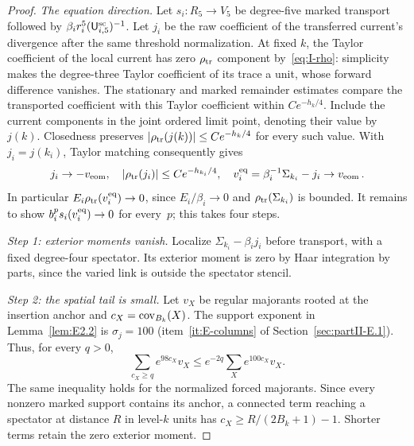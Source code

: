 \begin{proof}
\emph{The equation direction.} Let $s_i:R_5\to V_5$ be degree-five marked transport followed by $\beta_ir_i^5(\mathsf{U}_{i,5}^{\mathrm{sc}})^{-1}$. Let $j_i$ be the raw coefficient of the transferred current's divergence after the same threshold normalization. At fixed $k$, the Taylor coefficient of the local current has zero $\rho_{\rm tr}$ component by~\eqref{eq:I-rho}: simplicity makes the degree-three Taylor coefficient of its trace a unit, whose forward difference vanishes. The stationary and marked remainder estimates compare the transported coefficient with this Taylor coefficient within $Ce^{-h_k/4}$. Include the current components in the joint ordered limit point, denoting their value by $j(k)$. Closedness preserves $|\rho_{\rm tr}(j(k))|\le Ce^{-h_k/4}$ for every such value. With $j_i=j(k_i)$, Taylor matching consequently gives
\begin{equation*}
j_i\to-v_{\rm eom},\quad |\rho_{\rm tr}(j_i)|\le C e^{-h_{k_i}/4},\quad
v_i^{\rm eq}=\beta_i^{-1}\Sigma_{k_i}-j_i\to v_{\rm eom}\,.
\end{equation*}
In particular $E_i\rho_{\rm tr}(v_i^{\rm eq})\to0$, since $E_i/\beta_i\to0$ and $\rho_{\rm tr}(\Sigma_{k_i})$ is bounded. It remains to show $b_i^ps_i(v_i^{\rm eq})\to0$ for every~$p$; this takes four steps.

\emph{Step 1: exterior moments vanish.} Localize $\Sigma_{k_i}-\beta_i j_i$ before transport, with a fixed degree-four spectator. Its exterior moment is zero by Haar integration by parts, since the varied link is outside the spectator stencil.

\emph{Step 2: the spatial tail is small.} Let $v_X$ be regular majorants rooted at the insertion anchor and $c_X=\operatorname{cov}_{B_k}(X)$. The support exponent in Lemma~\ref{lem:E2.2} is $\sigma_j=100$ (item~\ref{it:E-columns} of Section~\ref{sec:partII-E.1}). Thus, for every $q>0$,
\begin{equation*}
 \sum_{c_X\ge q}e^{98c_X}v_X
 \le e^{-2q}\sum_Xe^{100c_X}v_X.
\end{equation*}
The same inequality holds for the normalized forced majorants. Since every nonzero marked support contains its anchor, a connected term reaching a spectator at distance $R$ in level-$k$ units has $c_X\ge R/(2B_k+1)-1$. Shorter terms retain the zero exterior moment.


\end{proof}
